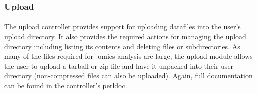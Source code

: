 \subsubsection{Upload}
\label{sec:controller_upload}

\paragraph{}
The upload controller provides support for uploading datafiles into the user's upload directory. It also provides the required actions for managing the upload directory including listing its contents and deleting files or subdirectories. As many of the files required for -omics analysis are large, the upload module allows the user to upload a tarball or zip file and have it unpacked into their user directory (non-compressed files can also be uploaded). Again, full documentation can be found in the controller's perldoc.


% 
